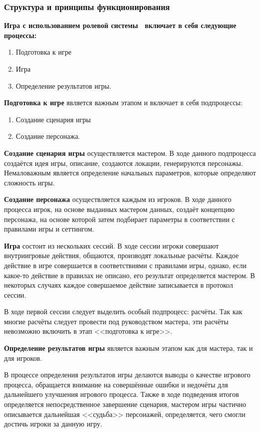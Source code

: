 \subsubsection{Структура и принципы функционирования}

\textbf{Игра с использованием ролевой системы \dnd\ включает в себя следующие процессы:}
\begin{enumerate}
\item Подготовка к игре
\item Игра
\item Определение результатов игры.
\end{enumerate}

\textbf{Подготовка к игре} является важным этапом и включает в себя подпроцессы:
\begin{enumerate}
\item Создание сценария игры
\item Создание персонажа.
\end{enumerate}

\textbf{Создание сценария игры} осуществляется мастером. В ходе данного подпроцесса создаётся идея игры, описание, создаются локации, генерируются персонажы. Немаловажным является определение начальных параметров, которые определяют сложность игры.

\textbf{Создание персонажа} осуществляется каждым из игроков. В ходе данного процесса игрок, на основе выданных мастером данных, создаёт концепцию персонажа, на основе которой затем подбирает параметры в соответствии с правилами игры и сеттингом.

\textbf{Игра} состоит из нескольких сессий. В ходе сессии игроки совершают внутриигровые действия, общаются, производят локальные расчёты. Каждое действие в игре совершается в соответствиями с правилами игры, однако, если какое-то действие в правилах не описано, его результат определяется мастером. В некоторых случаях каждое совершаемое действие записывается в протокол сессии.

В ходе первой сессии следует выделить особый подпроцесс: расчёты. Так как многие расчёты следует провести под руководством мастера, эти расчёты невозможно включить в этап <<подготовка к игре>>.

\textbf{Определение результатов игры} является важным этапом как для мастера, так и для игроков.

В процессе определения результатов игры делаются выводы о качестве игрового процесса, обращается внимание на совершённые ошибки и недочёты для дальнейшего улучшения игрового процесса. Также в ходе подведения итогов определяется непосредственное завершение сценария, мастером игры частично описывается дальнейшая <<судьба>> персонажей, определяется, чего смогли достичь игроки за данную игру.

